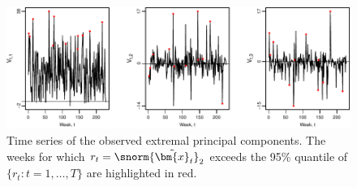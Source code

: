 \documentclass[en-GB, a4paper, nobind]{templates/bathreport}
\begin{document}
\begin{figure}

{\centering \includegraphics[width=1\linewidth]{figures/fr-tpdm-pcs-1} 

}

\caption[Time series of the observed extremal principal components.]{Time series of the observed extremal principal components. The weeks for which $r_t=\snorm{\tilde{\bm{x}}_t}_2$ exceeds the 95\% quantile of $\{r_t:t=1,\ldots,T\}$ are highlighted in red.}\label{fig:fr-tpdm-pcs}
\end{figure}
\end{document}
